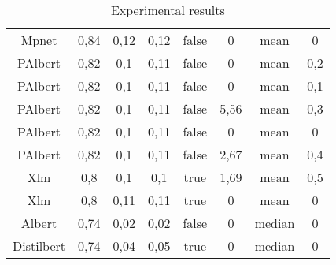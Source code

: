 \documentclass[\main/main.tex]{subfiles}
\begin{document}
\begin{table}
{\begin{tabular}{||c|c|c|c|c|c|c|c||}
Mpnet                 & 0,84 & 0,12  & 0,12  & false & 0     & mean   & 0   \\
PAlbert          & 0,82 & 0,1   & 0,11  & false & 0     & mean   & 0,2 \\
PAlbert          & 0,82 & 0,1   & 0,11  & false & 0     & mean   & 0,1 \\
PAlbert          & 0,82 & 0,1   & 0,11  & false & 5,56  & mean   & 0,3 \\
PAlbert          & 0,82 & 0,1   & 0,11  & false & 0     & mean   & 0   \\
PAlbert          & 0,82 & 0,1   & 0,11  & false & 2,67  & mean   & 0,4 \\
Xlm    & 0,8  & 0,1   & 0,1   & true  & 1,69  & mean   & 0,5 \\
Xlm    & 0,8  & 0,11  & 0,11  & true  & 0     & mean   & 0   \\
Albert                    & 0,74 & 0,02  & 0,02  & false & 0     & median & 0   \\
Distilbert & 0,74 & 0,04  & 0,05  & true  & 0     & median & 0   \\
\hline
\end{tabular}
}
\caption{Experimental results}
\label{tab:experimental_results_complete}
\end{table}
\end{document}

